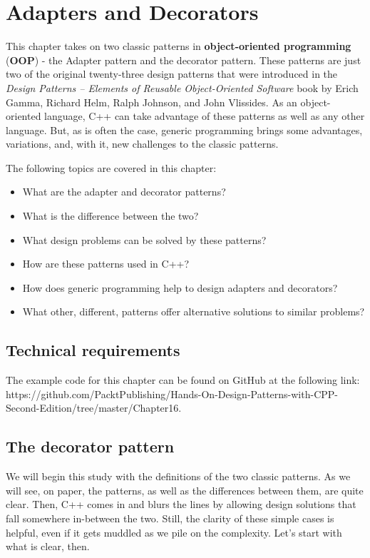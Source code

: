 ﻿\chapter{Adapters and Decorators}

This chapter takes on two classic patterns in \textbf{object-oriented programming} (\textbf{OOP}) - the Adapter pattern and the decorator pattern. These patterns are just two of the original twenty-three design patterns that were introduced in the \emph{Design Patterns -- Elements of Reusable Object-Oriented Software} book by Erich Gamma, Richard Helm, Ralph Johnson, and John Vlissides. As an object-oriented language, C++ can take advantage of these patterns as well as any other language. But, as is often the case, generic programming brings some advantages, variations, and, with it, new challenges to the classic patterns.

The following topics are covered in this chapter:

\begin{itemize}
\item
  What are the adapter and decorator patterns?
\item
  What is the difference between the two?
\item
  What design problems can be solved by these patterns?
\item
  How are these patterns used in C++?
\item
  How does generic programming help to design adapters and decorators?
\item
  What other, different, patterns offer alternative solutions to similar problems?
\end{itemize}

\section{Technical requirements}

The example code for this chapter can be found on GitHub at the following link: https://github.com/PacktPublishing/Hands-On-Design-Patterns-with-CPP-Second-Edition/tree/master/Chapter16.

\section{The decorator pattern}

We will begin this study with the definitions of the two classic patterns. As we will see, on paper, the patterns, as well as the differences between them, are quite clear. Then, C++ comes in and blurs the lines by allowing design solutions that fall somewhere in-between the two. Still, the clarity of these simple cases is helpful, even if it gets muddled as we pile on the complexity. Let's start with what is clear, then.

